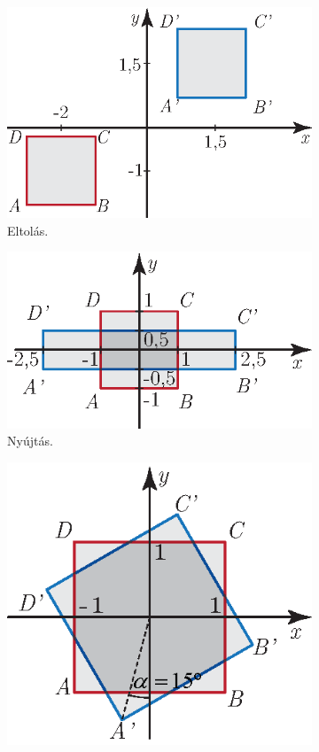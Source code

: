 \documentclass[12pt,a4paper]{scrartcl}
\begin{document}
\begin{figure}[htb] 
\centering
\begin{subfigure}[b]{0.45\textwidth}
\centering
\includegraphics[scale=1]{figs/eltolas_feladat.eps}
\caption{Eltolás.}
\label{fig:eltolas_feladat}
\end{subfigure} \hfill
\begin{subfigure}[b]{0.45\textwidth}
\centering
\includegraphics[scale=1]{figs/nyujtas_feladat.eps}
\caption{Nyújtás.}
\label{fig:nyujtas_feladat}
\end{subfigure}
\begin{subfigure}[b]{0.45\textwidth}
\centering
\includegraphics[scale=1]{figs/forgatas_feladat.eps}

\end{subfigure}
\end{figure}
\end{document}
